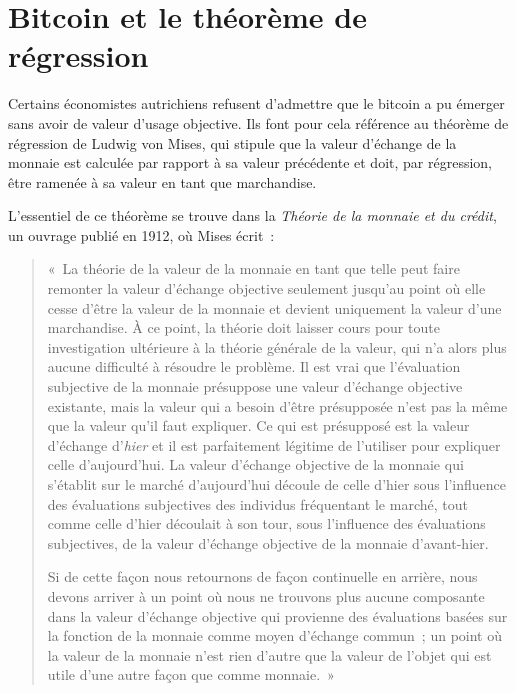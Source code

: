 \section*{Bitcoin et le théorème de régression}

Certains économistes autrichiens refusent d'admettre que le bitcoin a pu émerger sans avoir de valeur d'usage objective. Ils font pour cela référence au théorème de régression de Ludwig von Mises, qui stipule que la valeur d'échange de la monnaie est calculée par rapport à sa valeur précédente et doit, par régression, être ramenée à sa valeur en tant que marchandise.

L'essentiel de ce théorème se trouve dans la \emph{Théorie de la monnaie et du crédit}, un ouvrage publié en 1912, où Mises écrit~: 

\begin{quote}
«~La théorie de la valeur de la monnaie en tant que telle peut faire remonter la valeur d'échange objective seulement jusqu'au point où elle cesse d'être la valeur de la monnaie et devient uniquement la valeur d'une marchandise. À ce point, la théorie doit laisser cours pour toute investigation ultérieure à la théorie générale de la valeur, qui n'a alors plus aucune difficulté à résoudre le problème. Il est vrai que l'évaluation subjective de la monnaie présuppose une valeur d'échange objective existante, mais la valeur qui a besoin d'être présupposée n'est pas la même que la valeur qu'il faut expliquer. Ce qui est présupposé est la valeur d'échange d'\emph{hier} et il est parfaitement légitime de l'utiliser pour expliquer celle d'aujourd'hui. La valeur d'échange objective de la monnaie qui s'établit sur le marché d'aujourd'hui découle de celle d'hier sous l'influence des évaluations subjectives des individus fréquentant le marché, tout comme celle d'hier découlait à son tour, sous l'influence des évaluations subjectives, de la valeur d'échange objective de la monnaie d'avant-hier.

Si de cette façon nous retournons de façon continuelle en arrière, nous devons arriver à un point où nous ne trouvons plus aucune composante dans la valeur d'échange objective qui provienne des évaluations basées sur la fonction de la monnaie comme moyen d'échange commun~; un point où la valeur de la monnaie n'est rien d'autre que la valeur de l'objet qui est utile d'une autre façon que comme monnaie.~» %
\end{quote}
 
